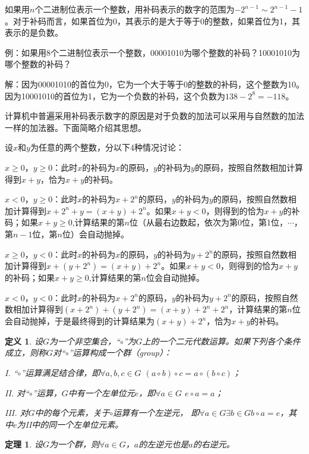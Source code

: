 \documentclass{article}
\newtheorem{Def}{定义}
\newtheorem{Thm}{定理}
\begin{document}
\begin{CJK*}{UTF8}{gbsn}
如果用$n$个二进制位表示一个整数，用补码表示的数字的范围为$-2^{n-1}\sim 2^{n-1}-1$。对于补码而言，如果首位为0，其表示的是大于等于0的整数，如果首位为1，其表示的是负数。

例：如果用8个二进制位表示一个整数，00001010为哪个整数的补码？10001010为哪个整数的补码？

解：因为00001010的首位为0，它为一个大于等于0的整数的补码，这个整数为10。因为10001010的首位为1，它为一个负数的补码，这个负数为$138-2^8=-118$。

计算机中普遍采用补码表示数字的原因是对于负数的加法可以采用与自然数的加法一样的加法器。下面简略介绍其思想。

设$x$和$y$为任意的两个整数，分以下4种情况讨论：

$x\geq 0$，$y\geq 0$：此时$x$的补码为$x$的原码，$y$的补码为$y$的原码，按照自然数相加计算得到$x+y$，恰为$x+y$的补码。

$x < 0$，$y \geq 0$：此时$x$的补码为$x+2^n$的原码，$y$的补码为$y$的原码，按照自然数相加计算得到$x+2^n+y=(x+y)+2^n$。如果$x+y<0$，则得到的恰为$x+y$的补码；如果$x+y\geq0$,计算结果的第$n$位（从最右边数起，依次为第0位，第1位，$\cdots$，第$n-1$位，第$n$位）会自动抛掉。

$x \geq 0$，$y < 0$：此时$x$的补码为$x$的原码，$y$的补码为$y+2^n$的原码，按照自然数相加计算得到$x+(y+2^n)=(x+y)+2^n$。如果$x+y<0$，则得到的恰为$x+y$的补码；如果$x+y\geq0$,计算结果的第$n$位会自动抛掉。

$x < 0$，$y < 0$：此时$x$的补码为$x+2^n$的原码，$y$的补码为$y+2^n$的原码，按照自然数相加计算得到$(x+2^n)+(y+2^n)=(x+y)+2^n + 2^n$，计算结果的第$n$位会自动抛掉，于是最终得到的计算结果为$(x+y)+2^n$，恰为$x+y$的补码。

\begin{Def}
  设$G$为一个非空集合，“$\circ$”为$G$上的一个二元代数运算。如果下列各个条件成立，则称$G$对“$\circ$”运算构成一个群（group）：

  I. “$\circ$”运算满足结合律，即$\forall a,b,c \in G$ $(a\circ b)\circ c = a\circ(b\circ c)$；

  II. 对“$\circ$”运算，$G$中有一个左单位元$e$，即$\forall a\in G$ $e\circ a = a$；

  III. 对$G$中的每个元素，关于$\circ$运算有一个左逆元，
  即$\forall a\in G \exists b\in G b\circ a = e$，其中$e$为II中的同一个左单位元素。
\end{Def}

\begin{Thm}
  设$G$为一个群，则$\forall a\in G$，$a$的左逆元也是$a$的右逆元。
\end{Thm}


\end{CJK*}
\end{document}
